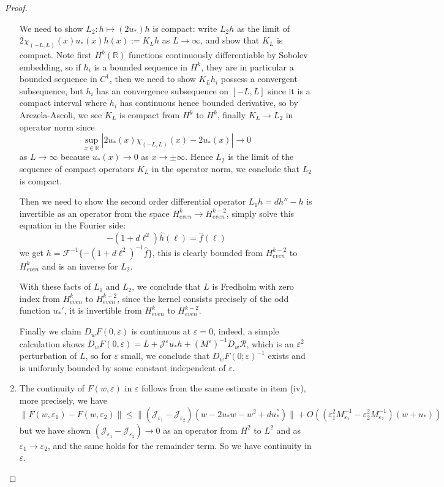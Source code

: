 \documentclass[letterpaper,11pt]{article}
\newcommand{\R}{\mathbb{R}}
\newcommand{\eps}{\varepsilon}
\numberwithin{equation}{section}
\theoremstyle{plain}
\begin{document}
\begin{proof}
\begin{enumerate}
We need to show $L_2: h \mapsto (2u_*)h$ is compact: write $L_2 h$ as the limit of $2\chi_{(-L,L)}(x) u_*(x) h(x):= K_L h$ as $L\to \infty$, and show that $K_L$ is compact. Note first $H^k(\R)$ functions continuously differentiable by Sobolev embedding, so if $h_i$ is a bounded sequence in $H^k$, they are in particular a bounded sequence in $C^1$, then we need to show $K_L h_i$ possess a convergent subsequence, but $h_i$ has an convergence subsequence on $[-L,L]$ since it is a compact interval where $h_i$ has continuous hence bounded derivative, so by Arezela-Ascoli, we see $K_L$ is compact from $H^k$ to $H^k$, finally $K_L \to L_2$ in operator norm since
\[
\sup_{x \in \R} |2u_*(x)\chi_{(-L,L)}(x) -2u_*(x) | \to 0
\]
as $L \to \infty$ because $u_*(x) \to 0$ as $x \to \pm \infty$. Hence $L_2$ is the limit of the sequence of compact operators $K_L$ in the operator norm, we conclude that $L_2$ is compact.


Then we need to show the second order differential operator $L_1 h = dh'' - h$ is invertible as an operator from the space $H^k_{even} \to H^{k-2}_{even}$, simply solve this equation in the Fourier side:
\[
-(1+d\ell^2)\hat{h}(\ell) = \hat{f}(\ell)
\]
we get $h = \mathcal{F}^{-1} \{-(1+d\ell^2)^{-1}\hat{f}\}$, this is clearly bounded from $H^{k-2}_{even}$ to $H^k_{even}$ and is an inverse for $L_2$.

With these facts of $L_1$ and $L_2$, we conclude that $L$ is Fredholm with zero index from $H^k_{even}$ to $H^{k-2}_{even}$, since the kernel consists precisely of the odd function $u_*'$, it is invertible from $H^k_{even}$ to $H^{k-2}_{even}$.

Finally we claim $D_wF(0,\eps)$ is continuous at $\eps = 0$, indeed, a simple calculation shows $D_wF(0,\eps) = L+\mathcal{J}^{\eps} u_*h+(M^{\eps})^{-1}D_w\mathcal{R}$, which is an $\eps^2$ perturbation of $L$, so for $\eps$ small, we conclude that $D_wF(0;\eps)^{-1}$ exists and is uniformly bounded by some constant independent of $\eps$.

\iffalse
\item The continuity of $F(w,\eps)$ in $\eps$ follows from the same estimate in item (iv), more precisely, we have
\[
\|F(w,\eps_1)-F(w,\eps_2) \|\le \|(\mathcal{J}_{\eps_1}-\mathcal{J}_{\eps_2})(w-2u_*w-w^2+du_*^{''})\| + O((\eps_1^2M_{\eps_1}^{-1}-\eps_2^2M_{\eps_2}^{-1})(w+u_*))
\]
but we have shown $(\mathcal{J}_{\eps_1}-\mathcal{J}_{\eps_2}) \to 0$ as an operator from $H^2$ to $L^2$ and as $\eps_1\to \eps_2$, and the same holds for the remainder term. So we have continuity in $\eps$.


\end{enumerate}
\end{proof}
\end{document}
